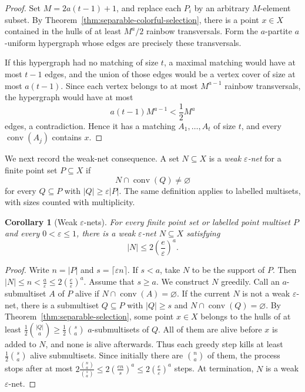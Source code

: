 \documentclass[11pt]{article}
\newtheorem{cor}[thm]{Corollary}
\theoremstyle{definition}
\newcommand{\conv}{\operatorname{conv}}
\begin{document}
\begin{proof}
Set $M=2a(t-1)+1$, and replace each $P_i$ by an arbitrary
$M$-element subset.  By
Theorem~\ref{thm:separable-colorful-selection}, there is a point
$x\in X$ contained in the hulls of at least $M^a/2$ rainbow
transversals.  Form the $a$-partite $a$-uniform hypergraph whose edges
are precisely these transversals.

If this hypergraph had no matching of size $t$, a maximal matching
would have at most $t-1$ edges, and the union of those edges would be
a vertex cover of size at most $a(t-1)$.  Since each vertex belongs to
at most $M^{a-1}$ rainbow transversals, the hypergraph would have at
most
\[
a(t-1)M^{a-1}<\frac12M^a
\]
edges, a contradiction.  Hence it has a matching
$A_1,\ldots,A_t$ of size $t$, and every $\conv(A_j)$ contains $x$.
\end{proof}

We next record the weak-net consequence.  A set $N\subseteq X$ is a
\emph{weak $\varepsilon$-net} for a finite point set $P\subseteq X$ if
\[
N\cap\conv(Q)\ne\varnothing
\]
for every $Q\subseteq P$ with $|Q|\ge\varepsilon|P|$.  The same
definition applies to labelled multisets, with sizes counted with
multiplicity.

\begin{cor}[Weak $\varepsilon$-nets]
\label{cor:separable-weak-epsilon-net}
For every finite point set or labelled point multiset $P$ and every
$0<\varepsilon\le1$, there is a weak $\varepsilon$-net
$N\subseteq X$ satisfying
\[
|N|\le 2\left(\frac e\varepsilon\right)^a.
\]
\end{cor}

\begin{proof}
Write $n=|P|$ and $s=\lceil\varepsilon n\rceil$.  If $s<a$, take
$N$ to be the support of $P$.  Then
$|N|\le n<\frac a\varepsilon
\le 2\left(\frac e\varepsilon\right)^a.$
Assume that $s\ge a$.  We construct $N$ greedily.  Call an
$a$-submultiset $A$ of $P$ alive if
$N\cap\conv(A)=\varnothing.$
If the current $N$ is not a weak $\varepsilon$-net, there is a
submultiset $Q\subseteq P$ with $|Q|\ge s$ and
$N\cap\conv(Q)=\varnothing.$
By Theorem~\ref{thm:separable-selection}, some point $x\in X$ belongs
to the hulls of at least
$\frac12\binom{|Q|}{a}
\ge\frac12\binom{s}{a}$
$a$-submultisets of $Q$.  All of them are alive before $x$ is added to
$N$, and none is alive afterwards.  Thus each greedy step kills at
least $\frac12\binom{s}{a}$ alive submultisets.  Since initially
there are $\binom{n}{a}$ of them, the process stops after at most
$2\frac{\binom{n}{a}}{\binom{s}{a}}
\le
2\left(\frac{en}{s}\right)^a
\le
2\left(\frac e\varepsilon\right)^a$
steps.  At termination, $N$ is a weak $\varepsilon$-net.
\end{proof}
\end{document}
